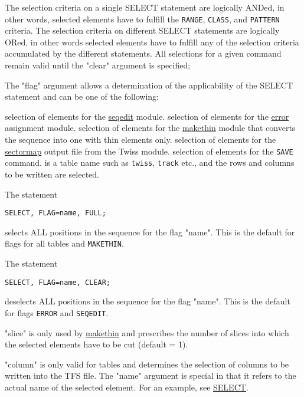 The selection criteria on a single SELECT statement are logically
ANDed, in other words, selected elements have to fulfill the {\tt RANGE},
{\tt CLASS}, and {\tt PATTERN} criteria.  
The selection criteria on different SELECT statements are logically
ORed, in other words selected elements have to fulfill any of the
selection criteria accumulated by the different statements.   
All selections for a given command remain valid until the "clear" argument
is specified; 

The "flag" argument allows a determination of the applicability of the
SELECT statement and can be one of the following: 
\begin{madlist}
    selection of elements for the
     \href{seqedit.html}{seqedit} module.  
    selection of elements for the
     \href{../error/error.html}{error} assignment module.  
    selection of elements for the
     \href{../makethin/makethin.html}{makethin} module that
     converts the sequence into one with thin elements only.  
    selection of elements for the
     \href{../Introduction/sectormap.html}{sectormap} output file
     from the Twiss module.  
    selection of elements for the {\tt SAVE} command.  
    is a table name such as {\tt twiss}, {\tt track}
     etc., and the rows and columns to be written are selected.  
\end{madlist} 

The statement
\begin{verbatim}
SELECT, FLAG=name, FULL;
\end{verbatim} 
selects ALL positions in the sequence for the flag "name". This is the default
for flags for all tables and {\tt MAKETHIN}.

The statement 
\begin{verbatim}
SELECT, FLAG=name, CLEAR;
\end{verbatim} 
deselects ALL positions in the sequence for the flag "name". This is the default
for flags {\tt ERROR} and {\tt SEQEDIT}.

"slice" is only used by \href{../makethin/makethin.html}{makethin} and
prescribes the number of slices into which the selected elements have to
be cut (default = 1).  

"column" is only valid for tables and determines the selection of columns
to be written into the TFS file. The "name" argument is special in that
it refers to the actual name of the selected element. For an example,
see \href{../Introduction/select.html}{SELECT}.  

